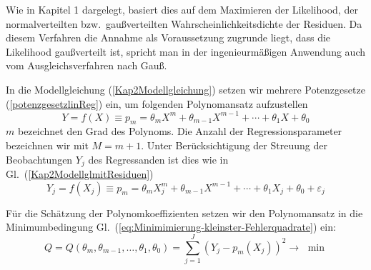 Wie in Kapitel 1 dargelegt, basiert dies auf dem Maximieren der Likelihood, der
normalverteilten bzw.\ gaußverteilten Wahrscheinlichkeitsdichte der Residuen. Da diesem Verfahren
die Annahme als Voraussetzung zugrunde liegt, dass die Likelihood gaußverteilt ist, spricht man in der
ingenieurmäßigen Anwendung auch vom Ausgleichsverfahren nach Gauß.

In die Modellgleichung (\ref{Kap2Modellgleichung}) setzen wir mehrere Potenzgesetze (\ref{potenzgesetzlinReg})
ein, um folgenden Polynomansatz aufzustellen
\begin{equation}
Y = f(X) \equiv p_m = \theta _m X ^m + \theta _{m-1} X^{m - 1} + 
\cdots + \theta _1 X + \theta _0
\end{equation}
$m$ bezeichnet den Grad des Polynoms. Die Anzahl der Regressionsparameter bezeichnen wir mit $M = m+1$.
Unter Berücksichtigung der Streuung der Beobachtungen $Y_j$ des Regressanden ist dies wie in Gl.~(\ref{Kap2ModellglmitResiduen})
\begin{equation}
Y_j = f(X_j) \equiv p_m = \theta _m X_j^m + \theta _{m-1} X^{m - 1} + \cdots + 
\theta _1 X_j + \theta _0 + \varepsilon_j
\end{equation}

Für die Schätzung der Polynomkoeffizienten setzen wir den Polynomansatz in die 
Minimumbedingung Gl.~(\ref{eq:Minimimierung-kleinster-Fehlerquadrate}) ein:
\begin{equation}
Q = Q(\theta _m ,\theta _{m - 1} ,\ldots ,\theta _1 ,\theta _0 ) =
\sum\limits_{j = 1}^J {(Y_j - p_m (X_j ))^2 \to } \,\,\min
\end{equation}

